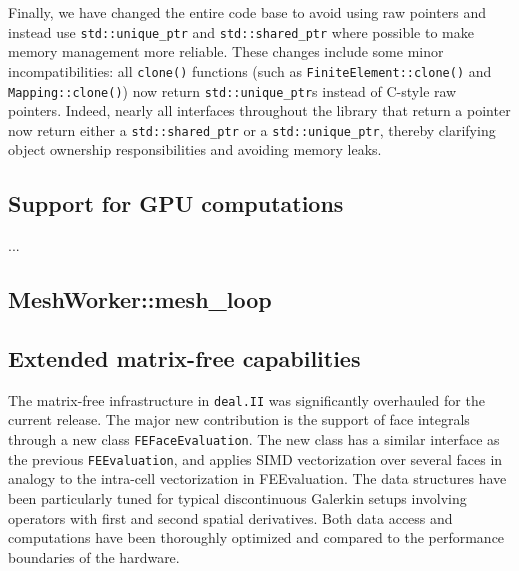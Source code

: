 \documentclass{ansarticle-preprint}
\newcommand{\specialword}[1]{\texttt{#1}}
\newcommand{\dealii}{{\specialword{deal.II}}\xspace}
\begin{document}
Finally, we have changed the entire code base to avoid using raw
pointers and instead use \texttt{std::unique\_ptr} and
\texttt{std::shared\_ptr} where possible to make memory management
more reliable. These changes include some minor incompatibilities: all
\texttt{clone()} functions (such as \texttt{FiniteElement::clone()} and
\texttt{Mapping::clone()}) now return \texttt{std::unique\_ptr}s instead of
C-style raw pointers. Indeed, nearly all interfaces throughout the library that return a pointer
now return either a \texttt{std::shared\_ptr} or a \texttt{std::unique\_ptr},
thereby clarifying object ownership responsibilities and avoiding memory leaks.


\subsection{Support for GPU computations}

...



\subsection{MeshWorker::mesh\_loop}


\subsection{Extended matrix-free capabilities}

The matrix-free infrastructure in \dealii{} was significantly overhauled for
the current release. The major new contribution is the support of face
integrals through a new class \texttt{FEFaceEvaluation}. The new class has a
similar interface as the previous \texttt{FEEvaluation}, and applies SIMD
vectorization over several faces in analogy to the intra-cell vectorization in
FEEvaluation. The data structures have been particularly tuned for typical
discontinuous Galerkin setups involving operators with first and second
spatial derivatives. Both data access and computations have been thoroughly
optimized and compared to the performance boundaries of the hardware.
\end{document}
